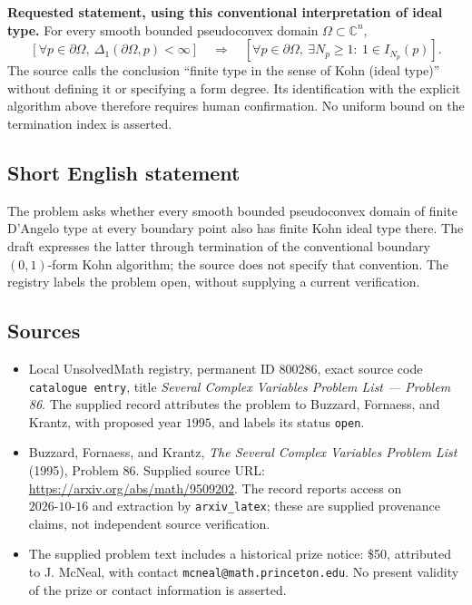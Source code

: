 \documentclass[11pt]{article}
\newcommand{\C}{\mathbb{C}}
\begin{document}
\textbf{Requested statement, using this conventional interpretation of ideal type.} For every smooth bounded pseudoconvex domain \(\Omega\subset\C^n\),
\[
\left[\forall p\in\partial\Omega,\ \Delta_1(\partial\Omega,p)<\infty\right]
\quad\Longrightarrow\quad
\left[\forall p\in\partial\Omega,\ \exists N_p\geq1:\ 1\in I_{N_p}(p)\right].
\]
The source calls the conclusion ``finite type in the sense of Kohn (ideal type)'' without defining it or specifying a form degree. Its identification with the explicit algorithm above therefore requires human confirmation. No uniform bound on the termination index is asserted.
\subsection{Short English statement}
The problem asks whether every smooth bounded pseudoconvex domain of finite D'Angelo type at every boundary point also has finite Kohn ideal type there. The draft expresses the latter through termination of the conventional boundary \((0,1)\)-form Kohn algorithm; the source does not specify that convention. The registry labels the problem open, without supplying a current verification.
\subsection{Sources}
\begin{itemize}
\item Local UnsolvedMath registry, permanent ID \(800286\), exact source code \texttt{catalogue entry}, title \emph{Several Complex Variables Problem List --- Problem 86}. The supplied record attributes the problem to Buzzard, Fornaess, and Krantz, with proposed year \(1995\), and labels its status \texttt{open}.
\item Buzzard, Fornaess, and Krantz, \emph{The Several Complex Variables Problem List} (1995), Problem 86. Supplied source URL: \url{https://arxiv.org/abs/math/9509202}. The record reports access on \(2026\text{-}10\text{-}16\) and extraction by \texttt{arxiv\_latex}; these are supplied provenance claims, not independent source verification.
\item The supplied problem text includes a historical prize notice: \$50, attributed to J. McNeal, with contact \texttt{mcneal@math.princeton.edu}. No present validity of the prize or contact information is asserted.
\end{itemize}
\end{document}
